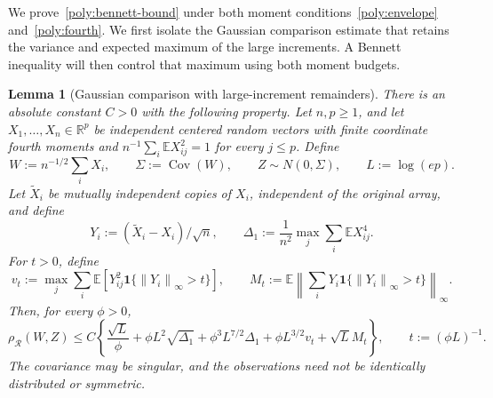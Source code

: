 \documentclass[11pt,letterpaper]{article}
\newenvironment{recovered}{}{}
\newtheorem{lemma}{Lemma}
\theoremstyle{remark}
\newcommand{\E}{\mathbb E}
\newcommand{\R}{\mathbb R}
\newcommand{\Cov}{\operatorname{Cov}}
\newcommand{\norm}[1]{\left\lVert#1\right\rVert}
\newcommand{\rh}{\rho_{\mathcal R}}
\newcommand{\ind}{\mathbf 1}
\begin{document}
\begin{recovered}
We prove~\eqref{poly:bennett-bound} under both moment
conditions~\eqref{poly:envelope} and~\eqref{poly:fourth}.
We first isolate the Gaussian comparison estimate that retains the
variance and expected maximum of the large increments. A Bennett
inequality will then control that maximum using both moment budgets.

\begin{lemma}[Gaussian comparison with large-increment remainders]
\label{ben:comparison}
There is an absolute constant \(C>0\) with the following property.
Let \(n,p\ge1\), and let \(X_1,\ldots,X_n\in\R^p\) be independent
centered random vectors with finite coordinate fourth moments and
\(n^{-1}\sum_i\E X_{ij}^2=1\) for every \(j\le p\). {Define}
\[
 W:=n^{-1/2}\sum_iX_i,\qquad \Sigma:=\Cov(W),\qquad
 Z\sim N(0,\Sigma),\qquad L:=\log(ep).
\]
Let \(\widetilde X_i\) be mutually independent copies of \(X_i\),
independent of the original array, and define
\[
 Y_i:=(\widetilde X_i-X_i)/\sqrt n,\qquad
 \Delta_1:=\frac1{n^2}\max_j\sum_i\E X_{ij}^4.
\]
For \(t>0\), define
\[
 v_t:=\max_j\sum_i\E[Y_{ij}^2\ind\{\norm{Y_i}_\infty>t\}],
 \qquad M_t:=\E\norm{\sum_iY_i\ind\{\norm{Y_i}_\infty>t\}}_\infty.
\]
Then, for every \(\phi>0\),
\begin{equation}
 \rh(W,Z)\le C\left\{
 \frac{\sqrt L}{\phi}+\phi L^2\sqrt{\Delta_1}
 +\phi^3L^{7/2}\Delta_1+\phi L^{3/2}v_t+\sqrt L M_t\right\},
 \qquad t:=(\phi L)^{-1}.
 \label{ben:master}
\end{equation}
The covariance may be singular, and the observations need not be
identically distributed or symmetric.
\end{lemma}
\end{recovered}
\end{document}
